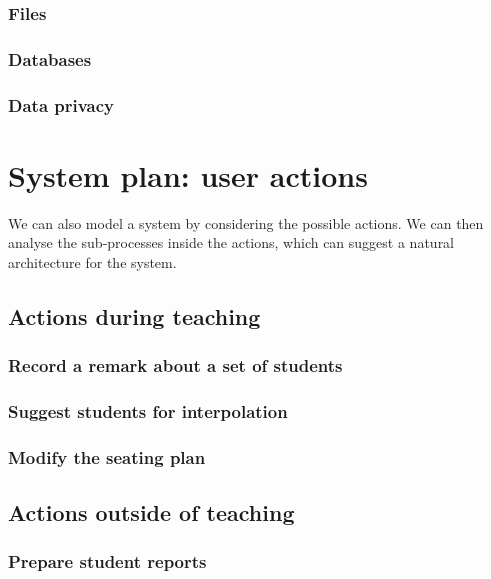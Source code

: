 \documentclass[10pt]{article}
\begin{document}
\subsubsection{Files}


\subsubsection{Databases}


\subsubsection{Data privacy} \label{dataprivacy}





\section{System plan: user actions} \label{actions}

We can also model a system by considering the possible actions. We can then analyse the sub-processes inside the actions, which can suggest a natural architecture for the system.



\subsection{Actions during teaching}

\subsubsection{Record a remark about a set of students}

\subsubsection{Suggest students for interpolation}

\subsubsection{Modify the seating plan}
 
 
 
 
\subsection{Actions outside of teaching}
 
\subsubsection{Prepare student reports}
\end{document}
